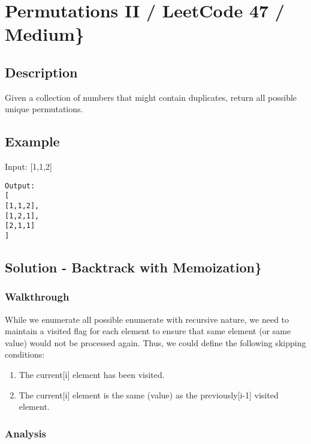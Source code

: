 \documentclass[]{book}
\begin{document}
\hypertarget{permutations-ii-leetcode-47-medium}{%
\section{Permutations II / LeetCode 47 / Medium\}}\label{permutations-ii-leetcode-47-medium}}

\hypertarget{description-14}{%
\subsection{Description}\label{description-14}}

Given a collection of numbers that might contain duplicates, return all possible unique permutations.

\hypertarget{example-13}{%
\subsection{Example}\label{example-13}}

Input: {[}1,1,2{]}

\begin{verbatim}
Output:
[
[1,1,2],
[1,2,1],
[2,1,1]
]
\end{verbatim}

\hypertarget{solution---backtrack-with-memoization-1}{%
\subsection{Solution - Backtrack with Memoization\}}\label{solution---backtrack-with-memoization-1}}

\hypertarget{walkthrough-13}{%
\subsubsection{Walkthrough}\label{walkthrough-13}}

While we enumerate all possible enumerate with recursive nature, we need to maintain a visited flag for each element
to ensure that same element (or same value) would not be processed again. Thus, we could define the following skipping
conditions:

\begin{enumerate}
    \item The current[i] element has been visited.
    \item The current[i] element is the same (value) as the previously[i-1] visited element.
\end{enumerate}

\hypertarget{analysis-15}{%
\subsubsection{Analysis}\label{analysis-15}}
\end{document}
